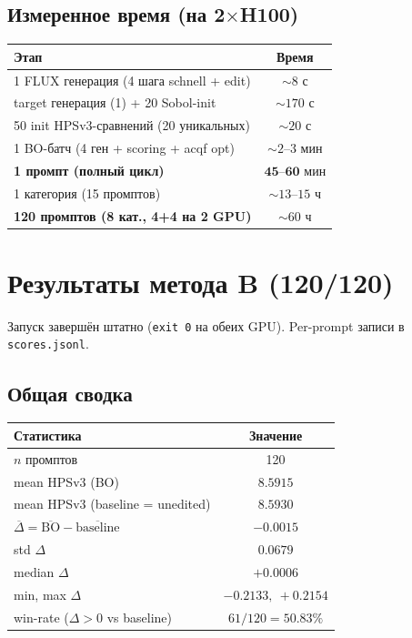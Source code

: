 \documentclass[11pt,a4paper]{article}
\begin{document}
\subsection{Измеренное время (на 2$\times$H100)}

\begin{center}
\begin{tabular}{lc}
\toprule
Этап & Время \\
\midrule
1 FLUX генерация (4 шага schnell + edit) & $\sim 8$ с \\
target генерация (1) + 20 Sobol-init     & $\sim 170$ с \\
50 init HPSv3-сравнений (20 уникальных)  & $\sim 20$ с \\
1 BO-батч (4 ген + scoring + acqf opt)    & $\sim 2\text{--}3$ мин \\
\midrule
\textbf{1 промпт (полный цикл)}           & $\textbf{45--60 мин}$ \\
1 категория (15 промптов)                 & $\sim 13\text{--}15$ ч \\
\textbf{120 промптов (8 кат., 4+4 на 2 GPU)} & $\textbf{\(\sim 60\) ч}$ \\
\bottomrule
\end{tabular}
\end{center}

\section{Результаты метода B (120/120)}

Запуск завершён штатно (\texttt{exit 0} на обеих GPU). Per-prompt записи
в \texttt{scores.jsonl}.

\subsection{Общая сводка}

\begin{center}
\begin{tabular}{lc}
\toprule
Статистика & Значение \\
\midrule
$n$ промптов                       & 120 \\
mean HPSv3 (BO)                    & $8.5915$ \\
mean HPSv3 (baseline = unedited)   & $8.5930$ \\
$\overline{\Delta} = \overline{\text{BO}} - \overline{\text{baseline}}$ & $-0.0015$ \\
std $\Delta$                       & $0.0679$ \\
median $\Delta$                    & $+0.0006$ \\
min, max $\Delta$                  & $-0.2133,\ +0.2154$ \\
win-rate ($\Delta > 0$ vs baseline) & $61/120 = 50.83\%$ \\
\bottomrule
\end{tabular}
\end{center}
\end{document}
